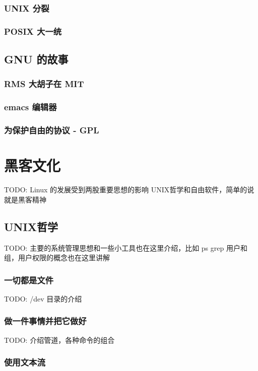 \documentclass[amstex]{ctexbook}
\begin{document}
\subsection{UNIX 分裂}

\subsection{POSIX 大一统}


\section{GNU 的故事}

\subsection{RMS 大胡子在 MIT}
\subsection{emacs 编辑器}
\subsection{为保护自由的协议 - GPL}

\chapter{黑客文化}


TODO:  Linux 的发展受到两股重要思想的影响 UNIX哲学和自由软件，简单的说就是黑客精神

\section{UNIX哲学}
TODO:  主要的系统管理思想和一些小工具也在这里介绍，比如 ps grep 用户和组，用户权限的概念也在这里讲解
\subsection{一切都是文件}

TODO:  /dev 目录的介绍

\subsection{做一件事情并把它做好}
TODO: 介绍管道，各种命令的组合
\subsection{使用文本流}
\end{document}
